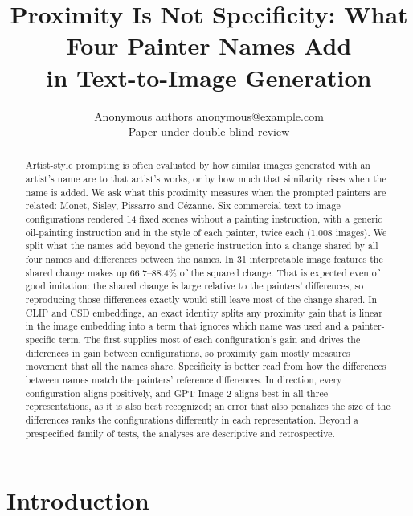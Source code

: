\documentclass[10pt]{article}
\title{Proximity Is Not Specificity: What Four Painter Names Add\\in Text-to-Image Generation}
\author{\name Anonymous authors \email anonymous@example.com \\
      \addr Paper under double-blind review}
\begin{document}
\maketitle

\begin{abstract}
Artist-style prompting is often evaluated by how similar images generated with an artist's name
are to that artist's works, or by how much that similarity rises when the name is added. We ask
what this proximity measures when the prompted painters are related: Monet, Sisley, Pissarro and
C\'ezanne. Six commercial text-to-image configurations rendered 14 fixed scenes without a painting
instruction, with a generic oil-painting instruction and in the style of each painter, twice each
(1,008 images). We split what the names add beyond the generic instruction into a change shared by
all four names and differences between the names. In 31 interpretable image features the shared
change makes up 66.7--88.4\% of the squared change. That is expected even of good imitation: the
shared change is large relative to the painters' differences, so reproducing those differences
exactly would still leave most of the change shared. In CLIP and CSD embeddings, an exact identity
splits any proximity gain that is linear in the image embedding into a term that ignores which name
was used and a painter-specific term. The first supplies most of each configuration's gain and
drives the differences in gain between configurations, so proximity gain mostly measures movement
that all the names share. Specificity is better read from how the differences between names match
the painters' reference differences. In direction, every configuration aligns positively, and GPT
Image 2 aligns best in all three representations, as it is also best recognized; an error that also
penalizes the size of the differences ranks the configurations differently in each representation.
Beyond a prespecified family of tests, the analyses are descriptive and retrospective.
\end{abstract}

\section{Introduction}\label{sec:intro}
\end{document}
